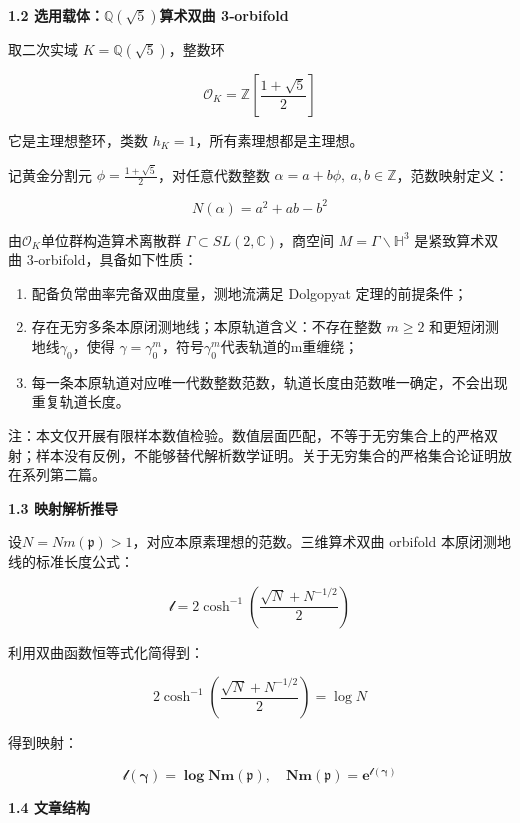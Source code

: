 \documentclass[12pt]{article}
\begin{document}
\textbf{1.2
选用载体：}\(\mathbb{Q}\left( \sqrt{5} \right)\)\textbf{算术双曲
3‑orbifold}

取二次实域 \(K = \mathbb{Q}\left( \sqrt{5} \right)\)，整数环

\[\mathcal{O}_{K} = \mathbb{Z}\left\lbrack \frac{1 + \sqrt{5}}{2} \right\rbrack\]

它是主理想整环，类数 \(h_{K} = 1\)，所有素理想都是主理想。

记黄金分割元 \(\phi = \frac{1 + \sqrt{5}}{2}\)，对任意代数整数
\(\alpha = a + b\phi,\ a,b \in \mathbb{Z}\)，范数映射定义：

\[N(\alpha) = a^{2} + ab - b^{2}\]

由\(\mathcal{O}_{K}\)单位群构造算术离散群
\(\Gamma \subset SL\left( 2,\mathbb{C} \right)\)，商空间
\(M = \Gamma\backslash\mathbb{H}^{3}\) 是紧致算术双曲
3‑orbifold，具备如下性质：

\begin{enumerate}
\def\labelenumi{\arabic{enumi}.}
\item
  配备负常曲率完备双曲度量，测地流满足 Dolgopyat 定理的前提条件；
\item
  存在无穷多条本原闭测地线；本原轨道含义：不存在整数 \(m \geq 2\)
  和更短闭测地线\(\gamma_{0}\)，使得
  \(\gamma = \gamma_{0}^{m}\)，符号\(\gamma_{0}^{m}\)代表轨道的m重缠绕；
\item
  每一条本原轨道对应唯一代数整数范数，轨道长度由范数唯一确定，不会出现重复轨道长度。
\end{enumerate}

注：本文仅开展有限样本数值检验。数值层面匹配，不等于无穷集合上的严格双射；样本没有反例，不能够替代解析数学证明。关于无穷集合的严格集合论证明放在系列第二篇。

\textbf{1.3 映射解析推导}

设\(N = Nm\left( \mathfrak{p} \right) > 1\)，对应本原素理想的范数。三维算术双曲
orbifold 本原闭测地线的标准长度公式：

\[\mathcal{l =}2\cosh^{- 1}\left( \frac{\sqrt{N} + N^{- 1/2}}{2} \right)\]

利用双曲函数恒等式化简得到：

\[2\cosh^{- 1}\left( \frac{\sqrt{N} + N^{- 1/2}}{2} \right) = \log N\]

得到映射：

\[\mathcal{l}\left( \mathbf{\gamma} \right) = \mathbf{\log Nm}\left( \mathfrak{p} \right),\quad\mathbf{Nm}\left( \mathfrak{p} \right) = \mathbf{e}^{\mathcal{l}\left( \mathbf{\gamma} \right)}\]

\textbf{1.4 文章结构}
\end{document}
